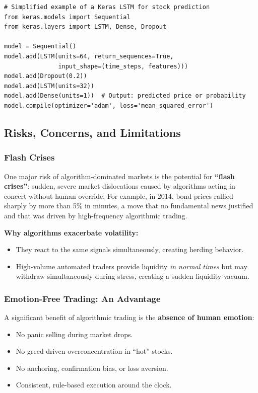 \documentclass[12pt,openany]{book}
\begin{document}
\begin{Verbatim}[fontsize=\small,breaklines=true]
# Simplified example of a Keras LSTM for stock prediction
from keras.models import Sequential
from keras.layers import LSTM, Dense, Dropout

model = Sequential()
model.add(LSTM(units=64, return_sequences=True,
               input_shape=(time_steps, features)))
model.add(Dropout(0.2))
model.add(LSTM(units=32))
model.add(Dense(units=1))  # Output: predicted price or probability
model.compile(optimizer='adam', loss='mean_squared_error')
\end{Verbatim}

\subsection{Risks, Concerns, and Limitations}

\subsubsection{Flash Crises}

One major risk of algorithm-dominated markets is the potential for \textbf{``flash crises''}: sudden, severe market dislocations caused by algorithms acting in concert without human override. For example, in 2014, bond prices rallied sharply by more than 5\% in minutes, a move that no fundamental news justified and that was driven by high-frequency algorithmic trading.

\textbf{Why algorithms exacerbate volatility:}
\begin{itemize}[leftmargin=*]
    \item They react to the same signals simultaneously, creating herding behavior.
    \item High-volume automated traders provide liquidity \textit{in normal times} but may withdraw simultaneously during stress, creating a sudden liquidity vacuum.
\end{itemize}

\subsubsection{Emotion-Free Trading: An Advantage}

A significant benefit of algorithmic trading is the \textbf{absence of human emotion}:
\begin{itemize}[leftmargin=*]
    \item No panic selling during market drops.
    \item No greed-driven overconcentration in ``hot'' stocks.
    \item No anchoring, confirmation bias, or loss aversion.
    \item Consistent, rule-based execution around the clock.
\end{itemize}
\end{document}
